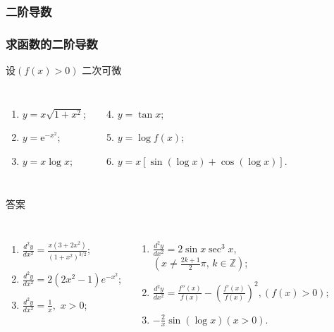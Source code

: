 \documentclass[
10pt,
aspectratio=43,
]{beamer}
\begin{document}
\subsubsection{二阶导数}
\begin{frame}
	\frametitle{求函数的二阶导数}
	\everymath{\displaystyle}
	\begin{block}{设$(f(x)>0)$ 二次可微}
		\begin{columns}[onlytextwidth]
			\begin{enumerate}
				\item $y=x \sqrt{1+x^2}$;
				\item $y=\mathrm{e}^{-x^2}$;
				\item $y=x \log x$;
			\end{enumerate}
			\begin{enumerate}
				\setcounter{enumi}{3}
				\item $y=\tan x$;
				\item $y=\log f(x)$;
				\item $y=x[\sin (\log x)+\cos (\log x)]$.
			\end{enumerate}
		\end{columns}
	\end{block}

	\begin{exampleblock}{答案}
		\begin{columns}[onlytextwidth]
			\begin{enumerate}
				\pause
				\item $\frac{d^2y}{dx^2} = \frac{x(3+2x^2)}{(1+x^2)^{3/2}}$;
				\item $\frac{d^2y}{dx^2} = 2(2x^2-1)e^{-x^2}$;
				\item $\frac{d^2y}{dx^2} = \frac{1}{x},\,\, x>0$;
			\end{enumerate}
			\begin{enumerate}
				\pause
				\setcounter{enumi}{3}
				\item $\frac{d^2y}{dx^2} = 2\sin x\sec^3 x$,\\\vspace{.1cm}$(x \neq \frac{2 k+1}{2} \pi,\,k\in\mathbb{Z})$;
				\item $\frac{d^2y}{dx^2} = \frac{f''(x)}{f(x)} - \left(\frac{f'(x)}{f(x)}\right)^2, (f(x)>0)$;
				\item $-\frac{2}{x} \sin (\log x)(x>0)$.
			\end{enumerate}
		\end{columns}
	\end{exampleblock}

\end{frame}
\end{document}
